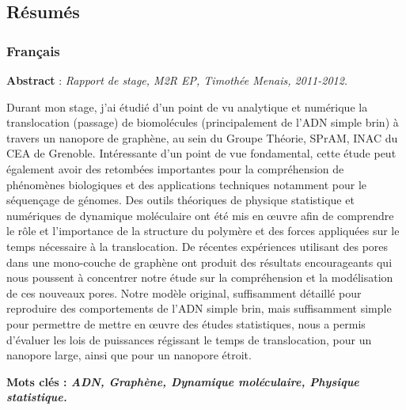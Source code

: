 \documentclass[a4paper,11pt]{article}
\begin{document}
\newpage

\subsection*{Résumés}

\subsubsection*{Français}

\parbox{15cm}{\small
\textbf{Abstract} : \it Rapport de stage, M2R EP, Timothée Menais, 2011-2012.

\vspace{0.5cm}
\rm Durant mon stage, j'ai étudié d'un point de vu analytique et numérique la translocation (passage) de biomolécules (principalement de l'ADN simple brin) à travers un nanopore de graphène, au sein du Groupe Théorie, SPrAM, INAC du CEA de Grenoble. Intéressante d'un point de vue fondamental, cette étude peut également avoir des retombées importantes pour la compréhension de phénomènes biologiques et des applications techniques notamment pour le séquençage de génomes. Des outils théoriques de physique statistique et numériques de dynamique moléculaire ont été mis en œuvre afin de comprendre le rôle et l'importance de la structure du polymère et des forces appliquées sur le temps nécessaire à la translocation. De récentes expériences utilisant des pores dans une mono-couche de graphène ont produit des résultats encourageants qui nous poussent à concentrer notre étude sur la compréhension et la modélisation de ces nouveaux pores. Notre modèle original, suffisamment détaillé pour reproduire des comportements de l'ADN simple brin, mais suffisamment simple pour permettre de mettre en œuvre des études statistiques, nous a permis d'évaluer les lois de puissances régissant le temps de translocation, pour un nanopore large, ainsi que pour un nanopore étroit.
} %


\vspace{0.5cm}

\parbox{15cm}{
\textbf{Mots clés : \it ADN, Graphène, Dynamique moléculaire, Physique statistique.} }
\end{document}
